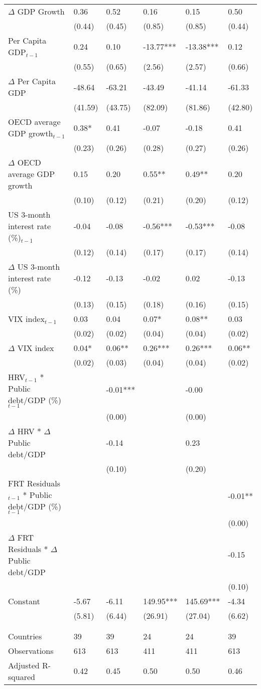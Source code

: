 {\begin{tabular}{lp{3cm}p{3cm}p{3cm}p{3cm}p{3cm}}
  $\Delta$ GDP Growth & 0.36 & 0.52 & 0.16 & 0.15 & 0.50 \\ 
   & (0.44) & (0.45) & (0.85) & (0.85) & (0.44) \\ 
  Per Capita GDP$_{t-1}$ & 0.24 & 0.10 & -13.77*** & -13.38*** & 0.12 \\ 
   & (0.55) & (0.65) & (2.56) & (2.57) & (0.66) \\ 
  $\Delta$ Per Capita GDP & -48.64 & -63.21 & -43.49 & -41.14 & -61.33 \\ 
   & (41.59) & (43.75) & (82.09) & (81.86) & (42.80) \\ 
  OECD average GDP growth$_{t-1}$ & 0.38* & 0.41 & -0.07 & -0.18 & 0.41 \\ 
   & (0.23) & (0.26) & (0.28) & (0.27) & (0.26) \\ 
  $\Delta$ OECD average GDP growth & 0.15 & 0.20 & 0.55** & 0.49** & 0.20 \\ 
   & (0.10) & (0.12) & (0.21) & (0.20) & (0.12) \\ 
  US 3-month interest rate (\%)$_{t-1}$ & -0.04 & -0.08 & -0.56*** & -0.53*** & -0.08 \\ 
   & (0.12) & (0.14) & (0.17) & (0.17) & (0.14) \\ 
  $\Delta$ US 3-month interest rate (\%) & -0.12 & -0.13 & -0.02 & 0.02 & -0.13 \\ 
   & (0.13) & (0.15) & (0.18) & (0.16) & (0.15) \\ 
  VIX index$_{t-1}$ & 0.03 & 0.04 & 0.07* & 0.08** & 0.03 \\ 
   & (0.02) & (0.02) & (0.04) & (0.04) & (0.02) \\ 
  $\Delta$ VIX index & 0.04* & 0.06** & 0.26*** & 0.26*** & 0.06** \\ 
   & (0.02) & (0.03) & (0.04) & (0.04) & (0.02) \\ 
  HRV$_{t-1}$ * Public debt/GDP (\%)$_{t-1}$ &  & -0.01*** &  & -0.00 &  \\ 
   &  & (0.00) &  & (0.00) &  \\ 
  $\Delta$ HRV * $\Delta$ Public debt/GDP &  & -0.14 &  & 0.23 &  \\ 
   &  & (0.10) &  & (0.20) &  \\ 
  FRT Residuals$_{t-1}$ * Public debt/GDP (\%)$_{t-1}$ &  &  &  &  & -0.01** \\ 
   &  &  &  &  & (0.00) \\ 
  $\Delta$ FRT Residuals * $\Delta$ Public debt/GDP &  &  &  &  & -0.15 \\ 
   &  &  &  &  & (0.10) \\ 
  Constant & -5.67 & -6.11 & 149.95*** & 145.69*** & -4.34 \\ 
   & (5.81) & (6.44) & (26.91) & (27.04) & (6.62) \\ 
   &  &  &  &  &  \\ 
   &  &  &  &  &  \\ 
  Countries & 39 & 39 & 24 & 24 & 39 \\ 
  Observations & 613 & 613 & 411 & 411 & 613 \\ 
  Adjusted R-squared & 0.42 & 0.45 & 0.50 & 0.50 & 0.46 \\ 
   \hline
\end{tabular}
}
